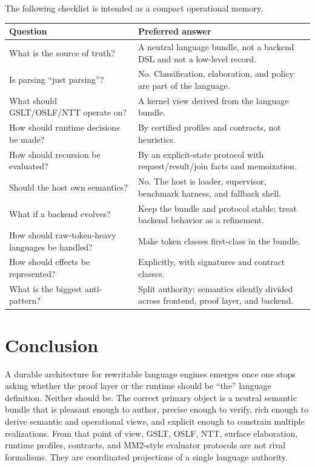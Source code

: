 \documentclass[11pt]{article}
\begin{document}
The following checklist is intended as a compact operational memory.

\begin{longtable}{p{}p{}}
\toprule
Question & Preferred answer \\
\midrule
What is the source of truth? & A neutral language bundle, not a backend DSL and not a low-level record. \\
Is parsing ``just parsing''? & No. Classification, elaboration, and policy are part of the language. \\
What should GSLT/OSLF/NTT operate on? & A kernel view derived from the language bundle. \\
How should runtime decisions be made? & By certified profiles and contracts, not heuristics. \\
How should recursion be evaluated? & By an explicit-state protocol with request/result/join facts and memoization. \\
Should the host own semantics? & No. The host is loader, supervisor, benchmark harness, and fallback shell. \\
What if a backend evolves? & Keep the bundle and protocol stable; treat backend behavior as a refinement. \\
How should raw-token-heavy languages be handled? & Make token classes first-class in the bundle. \\
How should effects be represented? & Explicitly, with signatures and contract classes. \\
What is the biggest anti-pattern? & Split authority: semantics silently divided across frontend, proof layer, and backend. \\
\bottomrule
\end{longtable}

\section{Conclusion}

A durable architecture for rewritable language engines emerges once one stops asking whether the proof layer or the runtime should be ``the'' language definition. Neither should be. The correct primary object is a neutral semantic bundle that is pleasant enough to author, precise enough to verify, rich enough to derive semantic and operational views, and explicit enough to constrain multiple realizations. From that point of view, GSLT, OSLF, NTT, surface elaboration, runtime profiles, contracts, and MM2-style evaluator protocols are not rival formalisms. They are coordinated projections of a single language authority.
\end{document}
